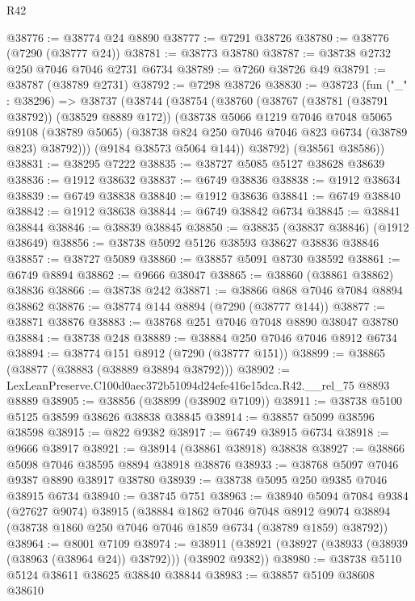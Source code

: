 \begin{lexlean}{R42}
\begin{coremodule}
{@38776 := @38774 @24 @8890
@38777 := @7291 @38726
@38780 := @38776 (@7290 (@38777 @24))
@38781 := @38773 @38780
@38787 := @38738 @2732 @250 @7046 @7046 @2731 @6734
@38789 := @7260 @38726 @49
@38791 := @38787 (@38789 @2731)
@38792 := @7298 @38726
@38830 := @38723
    (fun ("_" : @38296) =>
    @38737
      (@38744
        (@38754
          (@38760
            (@38767 (@38781 (@38791 @38792)) (@38529 @8889 @172))
            (@38738
              @5066
              @1219
              @7046
              @7048
              @5065
              @9108
              (@38789 @5065)
              (@38738 @824 @250 @7046 @7046 @823 @6734 (@38789 @823) @38792)))
          (@9184 @38573 @5064 @144))
        @38792)
      (@38561 @38586))
@38831 := @38295 @7222
@38835 := @38727 @5085 @5127 @38628 @38639
@38836 := @1912 @38632
@38837 := @6749 @38836
@38838 := @1912 @38634
@38839 := @6749 @38838
@38840 := @1912 @38636
@38841 := @6749 @38840
@38842 := @1912 @38638
@38844 := @6749 @38842 @6734
@38845 := @38841 @38844
@38846 := @38839 @38845
@38850 := @38835 (@38837 @38846) (@1912 @38649)
@38856 := @38738 @5092 @5126 @38593 @38627 @38836 @38846
@38857 := @38727 @5089
@38860 := @38857 @5091 @8730 @38592
@38861 := @6749 @8894
@38862 := @9666 @38047
@38865 := @38860 (@38861 @38862) @38836
@38866 := @38738 @242
@38871 := @38866 @868 @7046 @7084 @8894 @38862
@38876 := @38774 @144 @8894 (@7290 (@38777 @144))
@38877 := @38871 @38876
@38883 := @38768 @251 @7046 @7048 @8890 @38047 @38780
@38884 := @38738 @248
@38889 := @38884 @250 @7046 @7046 @8912 @6734
@38894 := @38774 @151 @8912 (@7290 (@38777 @151))
@38899 := @38865 (@38877 (@38883 (@38889 @38894 @38792)))
@38902 := LexLeanPreserve.C100d0aec372b51094d24efe416e15dca.R42.__rel_75 @8893 @8889
@38905 := @38856 (@38899 (@38902 @7109))
@38911 := @38738 @5100 @5125 @38599 @38626 @38838 @38845
@38914 := @38857 @5099 @38596 @38598
@38915 := @822 @9382
@38917 := @6749 @38915 @6734
@38918 := @9666 @38917
@38921 := @38914 (@38861 @38918) @38838
@38927 := @38866 @5098 @7046 @38595 @8894 @38918 @38876
@38933 := @38768 @5097 @7046 @9387 @8890 @38917 @38780
@38939 := @38738 @5095 @250 @9385 @7046 @38915 @6734
@38940 := @38745 @751
@38963 := @38940
    @5094
    @7084
    @9384
    (@27627 @9074)
    @38915
    (@38884
      @1862
      @7046
      @7048
      @8912
      @9074
      @38894
      (@38738 @1860 @250 @7046 @7046 @1859 @6734 (@38789 @1859) @38792))
@38964 := @8001 @7109
@38974 := @38911 (@38921 (@38927 (@38933 (@38939 (@38963 (@38964 @24)) @38792))) (@38902 @9382))
@38980 := @38738 @5110 @5124 @38611 @38625 @38840 @38844
@38983 := @38857 @5109 @38608 @38610
}
\end{coremodule}
\end{lexlean}
